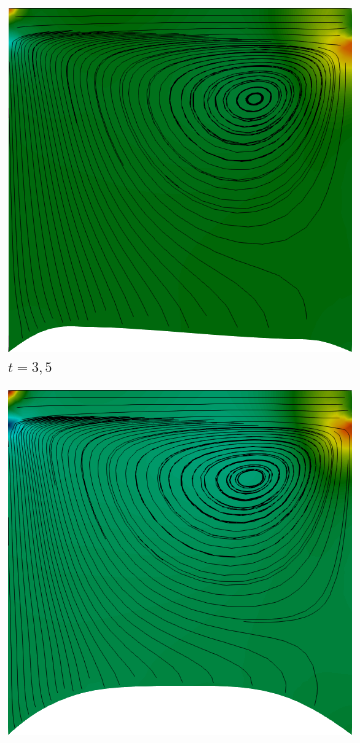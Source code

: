 \begin{figure}[h!]
    \centering
    \caption{Cavidade bidimensional - Campo de pressões e linhas de corrente na cavidade.}
    \begin{subfigure}[b]{0.3\textwidth}
        \includegraphics[width=\linewidth]{Figuras/FSI-Cavity2D/t3_5.png}
        \caption{$t=3,5$}
    \end{subfigure}
    \begin{subfigure}[b]{0.3\textwidth}
        \includegraphics[width=\linewidth]{Figuras/FSI-Cavity2D/t8.png}

\end{subfigure}
\end{figure}
